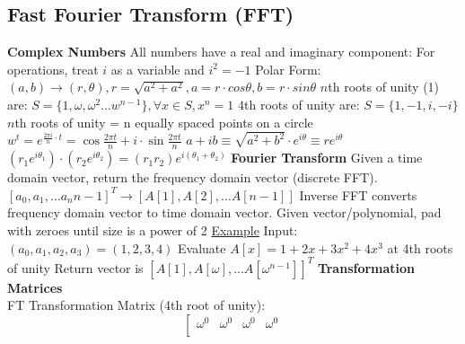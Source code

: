 \documentclass{article}
\begin{document}
\begin{multicols}{2}
\section*{Fast Fourier Transform (FFT)}
\textbf{Complex Numbers} \newline 
All numbers have a real and imaginary component: \newline 
For operations, treat $i$ as a variable and $i^2 = -1$ \newline 
Polar Form: $(a, b) \to (r, \theta), r = \sqrt{a^2 + a^2}, a = r \cdot cos \theta, b = r \cdot sin \theta$ \newline 
$n$th roots of unity (1) are: $S = \{1, \omega, \omega^2 \ldots w^{n-1}\}, \forall x \in S, x^n = 1$ \newline 
$4$th roots of unity are: $S = \{1, -1, i, -i\}$ \newline 
$n$th roots of unity = n equally spaced points on a circle \newline 
$w^t = e^{\frac{2 \pi i}{n} \cdot t} = \cos{\frac{2 \pi t}{n}} + i \cdot \sin{\frac{2 \pi t}{n}}$ \newline 
$a + ib \equiv \sqrt{a^2 + b^2} \cdot e^{i \theta} \equiv re^{i \theta}$ \newline 
$(r_1 e^{i \theta_1}) \cdot (r_2 e^{i \theta_2}) = (r_1 r_2) e^{i (\theta_1 + \theta_2)}$ \newline
\textbf{Fourier Transform} \newline 
Given a time domain vector, return the frequency domain vector (discrete FFT). \newline  
$[a_0, a_1, \ldots a_n{n-1}]^T \to [A[1], A[2], \ldots A[n-1]]$ \newline 
Inverse FFT converts frequency domain vector to time domain vector. \newline
Given vector/polynomial, pad with zeroes until size is a power of 2 \newline 
\underline{Example} \newline 
Input: $(a_0, a_1, a_2, a_3) = (1, 2, 3, 4)$ \newline 
Evaluate $A[x] = 1 + 2x + 3x^2 + 4x^3$ at 4th roots of unity \newline 
Return vector is $[A[1], A[\omega], \ldots A[\omega^{n-1}]]^T$ \newline
\textbf{Transformation Matrices} \\ 
FT Transformation Matrix (4th root of unity): \\ 
$$\left[
\begin{array}{ccccc}
\omega^0 & \omega^0 & \omega^0 & \omega^0 \\ 

\end{array}$$
\end{multicols}
\end{document}
